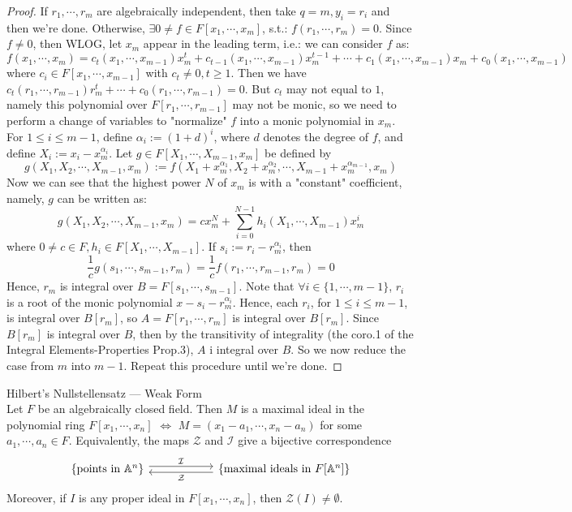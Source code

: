 \begin{proof}
    If $r_1 ,\cdots, r_m$ are algebraically independent, then take $q=m, y_i=r_i$ and then we're done. Otherwise, $\exists 0\neq f\in F[x_1 ,\cdots, x_m]$, s.t.: $f(r_1 ,\cdots, r_m)=0$. Since $f\neq 0$, then WLOG, let $x_m$ appear in the leading term, i.e.: we can consider $f$ as:
    $$f(x_1 ,\cdots, x_m)= c_t (x_1 ,\cdots, x_{m-1}) x_m^t +c_{t-1} (x_1 ,\cdots, x_{m-1})x_{m}^{t-1} +\cdots+ c_1 (x_1 ,\cdots, x_{m-1})x_m + c_0 (x_1 ,\cdots, x_{m-1})$$
    where $c_i \in F[x_1 ,\cdots, x_{m-1}]$ with $c_t \neq 0,t\geq 1$. Then we have $c_t (r_1 ,\cdots, r_{m-1}) r_m^t +\cdots+ c_0 (r_1 ,\cdots, r_{m-1})=0$. But $c_t$ may not equal to $1$, namely this polynomial over $F[r_1 ,\cdots, r_{m-1}]$ may not be monic, so we need to perform a change of variables to "normalize" $f$ into a monic polynomial in $x_m$.\\
    For $1 \leq i \leq m-1$, define $\alpha_i := (1+d)^i$, where $d$ denotes the degree of $f$, and define $X_i:= x_i- x_m^{\alpha_i}$. Let $g \in F[X_1 ,\cdots, X_{m-1} ,x_m]$ be defined by
    $$g(X_1, X_2 ,\cdots, X_{m-1} ,x_m):= f(X_1 +x_m^{\alpha_1} ,X_2+ x_m^{\alpha_2} ,\cdots, X_{m-1}+ x_m^{\alpha_{m-1}} ,x_m)$$
    Now we can see that the highest power $N$ of $x_m$ is with a "constant" coefficient, namely, $g$ can be written as:
    $$g(X_1, X_2 ,\cdots, X_{m-1} ,x_m) = cx_m^N + \sum_{i=0}^{N-1} h_i (X_1, \cdots, X_{m-1}) x_m^i$$
    where $0\neq c \in F,h_i \in F[X_1 ,\cdots, X_{m-1}]$. If $s_i:= r_i-r_m^{\alpha_i}$, then
    $$\frac{1}{c} g(s_1 ,\cdots, s_{m-1} ,r_m) = \frac{1}{c} f(r_1 ,\cdots, r_{m-1} ,r_m) =0$$
    Hence, $r_m$ is integral over $B=F[s_1 ,\cdots, s_{m-1}]$. Note that $\forall i \in \{1 ,\cdots, m-1\}$, $r_i$ is a root of the monic polynomial $x- s_i- r_m^{\alpha_i}$. Hence, each $r_i$, for $1\leq i\leq m-1$, is integral over $B[r_m]$, so $A= F[r_1 ,\cdots, r_m]$ is integral over $B[r_m]$. Since $B[r_m]$ is integral over $B$, then by the transitivity of integrality (the coro.1 of the Integral Elements-Properties Prop.3), $A$ i integral over $B$. So we now reduce the case from $m$ into $m-1$. Repeat this procedure until we're done.
\end{proof}

\begin{theorem}{Hilbert's Nullstellensatz --- Weak Form}\\
Let $F$ be an algebraically closed field. Then $M$ is a maximal ideal in the polynomial ring $F[x_1 ,\cdots, x_n]$ $\Leftrightarrow$ $M= (x_1 -a_1 ,\cdots, x_n-a_n)$ for some $a_1 ,\cdots, a_n \in F$. Equivalently, the maps $\mathcal{Z}$ and $\mathcal{I}$ give a bijective correspondence
\[
\begin{tikzcd}[column sep=2cm]
    \{ \text{points in } \mathbb{A}^n\} \arrow[r, shift left=0.6ex, "\mathcal{I}"] & \{ \text{maximal ideals in } F[\mathbb{A}^n] \} \arrow[l, shift left=0.6ex, "\mathcal{Z}"]
\end{tikzcd}
\]
Moreover, if $I$ is any proper ideal in $F[x_1 ,\cdots, x_n]$, then $\mathcal{Z}(I) \neq \emptyset$.
\end{theorem}

